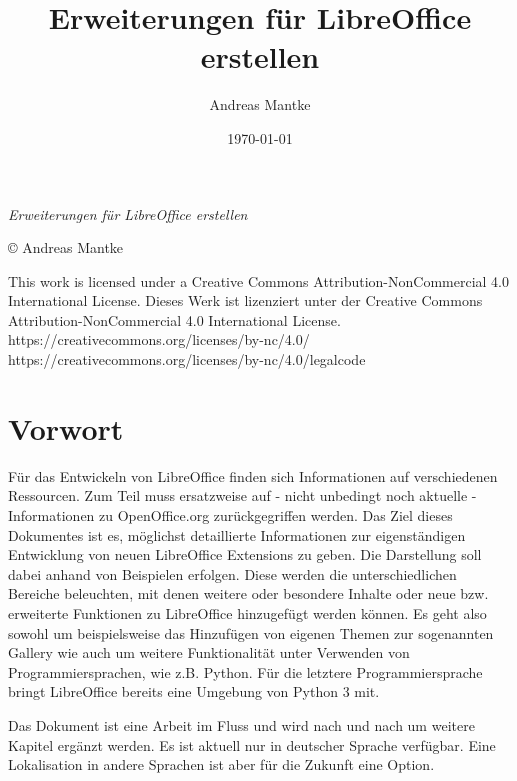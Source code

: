 \documentclass[a4paper,10pt,pagesize,titlepage]{scrbook}
\author{Andreas Mantke}
\title{Erweiterungen für LibreOffice erstellen}
\date{\today}
\begin{document}
 


\maketitle
 \setcounter{tocdepth}{10}


\begin{flushleft}
	
	\textit{Erweiterungen für LibreOffice erstellen}
	
	© Andreas Mantke 
	
	
	\noindent This work is licensed under a Creative Commons Attribution-NonCommercial 4.0 International License. Dieses Werk ist lizenziert unter der Creative Commons Attribution-NonCommercial 4.0 International License.
	https://creativecommons.org/licenses/by-nc/4.0/
	https://creativecommons.org/licenses/by-nc/4.0/legalcode
\end{flushleft}


\tableofcontents
\listoffigures

\chapter*{Vorwort}

Für das Entwickeln von LibreOffice finden sich Informationen auf verschiedenen Ressourcen. Zum Teil muss ersatzweise auf - nicht unbedingt noch aktuelle - Informationen zu OpenOffice.org zurückgegriffen werden. Das Ziel dieses Dokumentes ist es, möglichst detaillierte Informationen zur eigenständigen Entwicklung von neuen LibreOffice Extensions zu geben. Die Darstellung soll dabei anhand von Beispielen erfolgen. Diese werden die unterschiedlichen Bereiche beleuchten, mit denen weitere oder besondere Inhalte oder neue bzw. erweiterte Funktionen zu LibreOffice hinzugefügt werden können. Es geht also sowohl um beispielsweise das Hinzufügen von eigenen Themen zur sogenannten Gallery wie auch um weitere Funktionalität unter Verwenden von Programmiersprachen, wie z.B. Python. Für die letztere Programmiersprache bringt LibreOffice bereits eine Umgebung von Python 3 mit.

Das Dokument ist eine Arbeit im Fluss und wird nach und nach um weitere Kapitel ergänzt werden. Es ist aktuell nur in deutscher Sprache verfügbar. Eine Lokalisation in andere Sprachen ist aber für die Zukunft eine Option.
\end{document}
